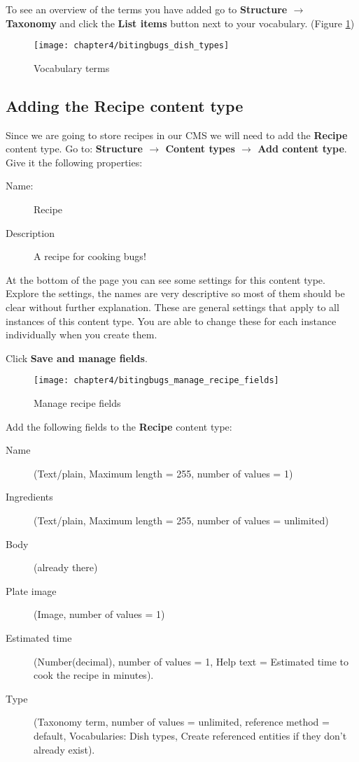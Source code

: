    To see an overview of the terms you have added go to \textbf{Structure $\rightarrow$ Taxonomy} and click the \textbf{List items} button next to your vocabulary. (Figure \ref{fig:bitingbugs_dish_types})
    
    \begin{figure}[H]
    	\centering
    	\texttt{[image: chapter4/bitingbugs\_dish\_types]}
    	\caption{Vocabulary terms}
    	\label{fig:bitingbugs_dish_types}
    \end{figure}
    
    \subsection{Adding the \textbf{Recipe} content type}
    
    Since we are going to store recipes in our CMS we will need to add the \textbf{Recipe} content type. Go to: \textbf{Structure $\rightarrow$ Content types $\rightarrow$ Add content type}. Give it the following properties:
    
    \begin{description}
    	\item[Name:] Recipe 
    	\item[Description] A recipe for cooking bugs!
    \end{description}
    
    At the bottom of the page you can see some settings for this content type. Explore the settings, the names are very descriptive so most of them should be clear without further explanation. These are general settings that apply to all instances of this content type. You are able to change these for each instance individually when you create them.
    
    Click \textbf{Save and manage fields}.
    
    
    \begin{figure}[H]
    	\centering
    	\texttt{[image: chapter4/bitingbugs\_manage\_recipe\_fields]}
    	\caption{Manage recipe fields}
    	\label{fig:bitingbugs_manage_recipe_fields}
    \end{figure}
    
    Add the following fields to the \textbf{Recipe} content type:
    
    \begin{description}
    	\item[Name] (Text/plain, Maximum length = 255, number of values = 1) 
    	\item[Ingredients] (Text/plain, Maximum length = 255, number of values = unlimited)
    	\item[Body] (already there)
    	\item[Plate image] (Image, number of values = 1)
    	\item[Estimated time] (Number(decimal), number of values = 1, Help text = Estimated time to cook the recipe in minutes).
    	\item[Type] (Taxonomy term, number of values = unlimited, reference method = default, Vocabularies: Dish types, Create referenced entities if they don't already exist).
    \end{description}
    
